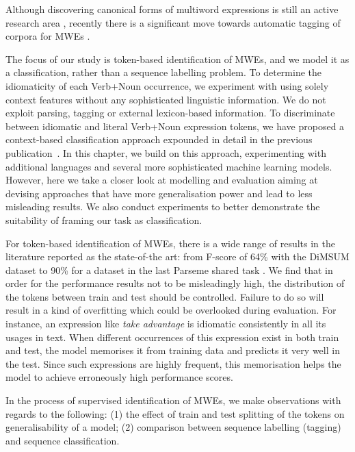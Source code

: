 \documentclass[output=paper
,modfonts
,nonflat]{langsci/langscibook}
\begin{document}
Although discovering canonical forms of multiword expressions is still an active research area \citep{salehi2013, farahmand2014}, recently there is a significant move towards automatic tagging of corpora for MWEs \citep{Schneider14b,constant2012evaluating}.

The focus of our study is token-based identification of MWEs, and we model it as a classification, rather than a sequence labelling problem.
To determine the idiomaticity of each Verb+Noun occurrence, we experiment with using solely context features without any sophisticated linguistic information. We do not exploit parsing, tagging or external lexicon-based information.
To discriminate between idiomatic and literal Verb+Noun expression tokens, we have proposed a context-based classification approach expounded in detail in the previous publication~\citep{taslimipoor2017}. In this chapter, we build on this approach, experimenting with additional languages and several more sophisticated machine learning models. However, here we take a closer look at modelling and evaluation aiming at devising approaches that have more generalisation power and lead to less misleading results. We also conduct experiments to better demonstrate the suitability of framing our task as classification.

For token-based identification of MWEs, there is a wide range of results in the literature reported as the state-of-the art: from F-score of 64\% with the DiMSUM dataset \citep{schneider-dimsum:2016} to 90\% \citep{W17-1717} for a dataset in the last Parseme shared task \citep{MWEWorkshop}.
We find that in order for the performance results not to be misleadingly high, the distribution of the tokens between train and test should be controlled. Failure to do so will result in a kind of overfitting which could be overlooked during evaluation. For instance, an expression like \textit{take advantage} is idiomatic consistently in all its usages in text. When different occurrences of this expression exist in both train and test, the model memorises it from training data and predicts it very well in the test. Since such expressions are highly frequent, this memorisation helps the model to achieve erroneously high performance scores.

In the process of supervised identification of MWEs, we make observations with regards to the following: (1) the effect of train and test splitting of the tokens on generalisability of a model; (2) comparison between sequence labelling (tagging) and sequence classification.
\end{document}
